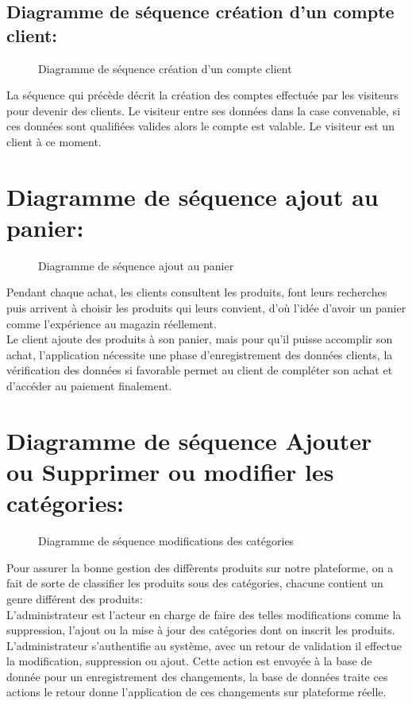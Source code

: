 \documentclass[a4paper]{report}
\begin{document}
\begin{doublespace}
	\subsection{Diagramme de séquence création d'un compte
		client:}
	\begin{figure}[H]
		\begin{center}
			\caption{Diagramme de séquence création d'un compte
				client}
		\end{center}
	\end{figure}
	La séquence  qui précède décrit la création des comptes
	effectuée par les visiteurs pour devenir des clients. Le visiteur entre ses
	données dans la case convenable, si ces données sont qualifiées valides alors
	le compte est valable. Le visiteur est un client à ce moment.
	\section{Diagramme de séquence ajout au panier:}
	\begin{figure}[H]
		\begin{center}
			\caption{Diagramme de séquence ajout au panier}
		\end{center}
	\end{figure}
	Pendant chaque achat, les clients consultent les produits,
	font leurs recherches puis arrivent à choisir les produits qui leurs convient,
	d'où l'idée d'avoir un panier comme l'expérience au magazin réellement. \\Le
	client ajoute des produits à son panier, mais pour qu'il puisse accomplir son
	achat, l'application nécessite une phase d'enregistrement des données clients,
	la vérification des données si favorable permet au client de compléter son
	achat et d'accéder au paiement finalement.

	\section{Diagramme de séquence Ajouter ou Supprimer ou
	  modifier les catégories:}
	\begin{figure}[H]
		\begin{center}
			\caption{Diagramme de séquence modifications des
				catégories}
		\end{center}
	\end{figure}
	Pour assurer la bonne gestion des diffèrents produits sur
	notre plateforme, on a fait de sorte de classifier les produits sous des
	catégories, chacune contient un genre différent des produits:\\
	L'administrateur est l'acteur en charge de faire des telles modifications comme
	la suppression, l'ajout ou la mise à jour des catégories dont on inscrit les
	produits. L'administrateur s'authentifie au système, avec un retour de
	validation il effectue la modification, suppression ou ajout. Cette action est
	envoyée à la base de donnée pour un enregistrement des changements, la base de
	données traite ces actions le retour donne l'application de ces changements sur
	plateforme réelle.

\end{doublespace}
\end{document}
